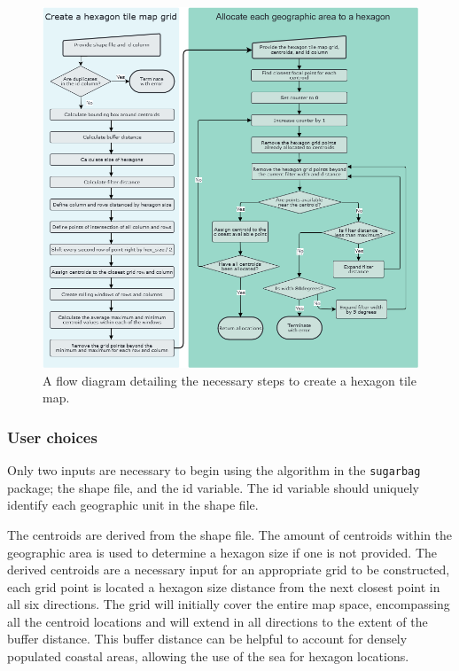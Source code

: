 \begin{figure}
\includegraphics[width=14cm]{figs/sugarbag flow.png}
\caption{\label{fig:sugarbag_flow}A flow diagram detailing the necessary steps to create a hexagon tile map.}
\end{figure}

\hypertarget{user-choices}{%
\subsubsection{User choices}\label{user-choices}}

Only two inputs are necessary to begin using the algorithm in the
\texttt{sugarbag} package; the shape file, and the id variable. The id
variable should uniquely identify each geographic unit in the shape
file.

The centroids are derived from the shape file. The amount of centroids
within the geographic area is used to determine a hexagon size if one is
not provided. The derived centroids are a necessary input for an
appropriate grid to be constructed, each grid point is located a hexagon
size distance from the next closest point in all six directions. The
grid will initially cover the entire map space, encompassing all the
centroid locations and will extend in all directions to the extent of
the buffer distance. This buffer distance can be helpful to account for
densely populated coastal areas, allowing the use of the sea for hexagon
locations.

